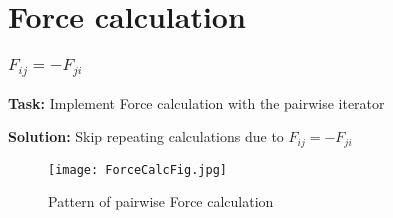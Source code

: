 \section{Force calculation}

\begin{frame}
    \frametitle{$F_{ij} = -F_{ji}$}
    \textbf{Task:} Implement Force calculation with the pairwise iterator

    \textbf{Solution:} Skip repeating calculations due to $F_{ij} = -F_{ji}$

    \begin{figure}[ht]
    \centering
            \texttt{[image: ForceCalcFig.jpg]}
            \caption{Pattern of pairwise Force calculation}
    \end{figure}
\end{frame}
